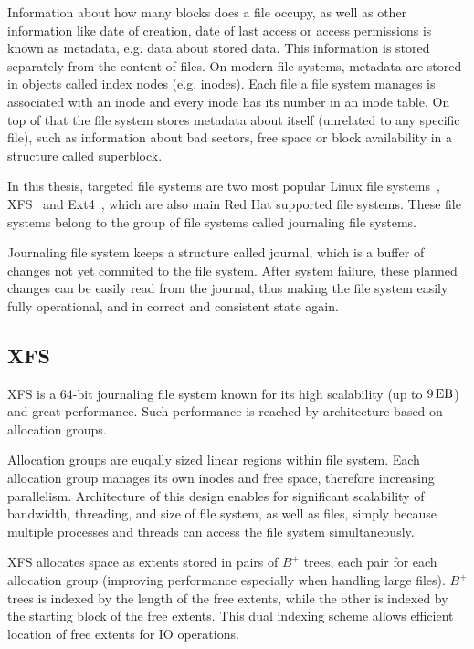 \documentclass[
  color, %
  table, %
  lof,   %
  lot,   %
]{fithesis3}
\begin{document}
Information about how many blocks does a file occupy, as well as other information like date of creation, date of last access or access permissions is known as metadata, e.g. data about stored data. This information is stored separately from the content of files. On modern file systems, metadata are stored in objects called index nodes (e.g. inodes). Each file a file system manages is associated with an inode and every inode has its number in an inode table. On top of that the file system stores metadata about itself (unrelated to any specific file), such as information about bad sectors, free space or block availability in a structure called superblock.

In this thesis, targeted file systems are two most popular Linux file systems~\cite{Lu:2013:SLF:2591272.2591276}, XFS~\cite{xfs:qhe} and Ext4~\cite{ext4:qhe}, which are also main Red Hat supported file systems. These file systems belong to the group of file systems called journaling file systems.

Journaling file system keeps a structure called journal, which is a buffer of changes not yet commited to the file system. After system failure, these planned changes can be easily read from the journal, thus making the file system easily fully operational, and in correct and consistent state again.

\subsection{XFS}
XFS is a 64-bit journaling file system known for its high scalability (up to $\SI{9}{\exa\byte}$) and great performance. Such performance is reached by architecture based on allocation groups.

Allocation groups are euqally sized linear regions within file system. Each allocation group manages its own inodes and free space, therefore increasing parallelism. Architecture of this design enables for significant scalability of bandwidth, threading, and size of file system, as well as files, simply because multiple processes and threads can access the file system simultaneously.

XFS allocates space as extents stored in pairs of $B^+$ trees, each pair for each allocation group (improving performance especially when handling large files). $B^+$ trees is indexed by the length of the free extents, while the other is indexed by the starting block of the free extents. This dual indexing scheme allows efficient location of free extents for IO operations.
\end{document}
